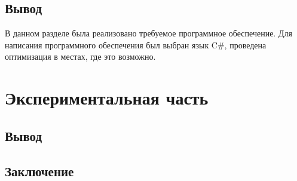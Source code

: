 \documentclass{article}
\begin{document}
	\subsection{Вывод}
	\indent В данном разделе была реализовано требуемое программное обеспечение. Для написания программного обеспечения был выбран язык C\#, проведена оптимизация в местах, где это возможно.

	\newpage
	\section{Экспериментальная часть}
	
	\subsection{Вывод}

	\newpage
	\begin{center}
		\section*{Заключение}
	\end{center}
	\newpage
	
\end{document}

